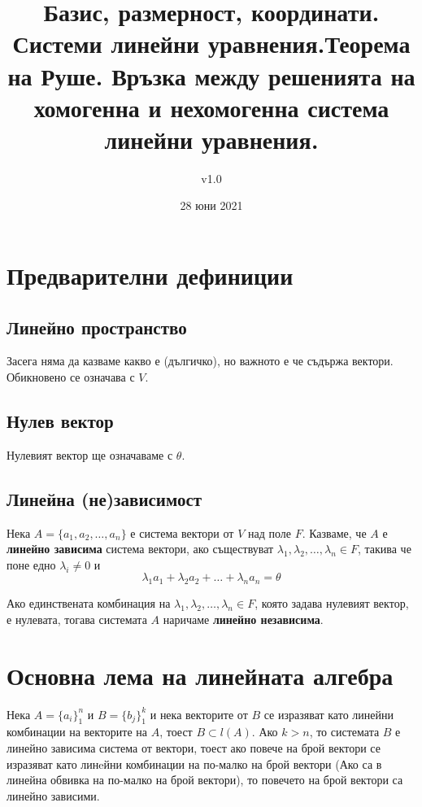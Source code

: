 \documentclass[fleqn,12pt]{article}
\title{Базис, размерност, координати.  Системи линейни уравнения.Теорема на Руше. Връзка между решенията на хомогенна и нехомогенна система линейни уравнения.}
\author{v1.0}
\date{28 юни 2021}
\begin{document}
\maketitle

\tableofcontents
\pagebreak

\begin{flushleft}

\section{Предварителни дефиниции}
\subsection{Линейно пространство}
Засега няма да казваме какво е (дългичко), но важното е че съдържа вектори. Обикновено се означава с $V$.

\subsection{Нулев вектор}
Нулевият вектор ще означаваме с $\theta$.

\subsection{Линейна (не)зависимост}
Нека $A = \{a_1, a_2, \dots, a_n\}$ е система вектори от $V$ над поле $F$. Казваме, че $A$ е
\textbf{линейно зависима} система вектори, ако съществуват $\lambda_1, \lambda_2, \dots, \lambda_n \in F$, такива че 
поне едно $\lambda_i \neq 0$ и
\[ \lambda_1 a_1 + \lambda_2 a_2 + \dots + \lambda_n a_n = \theta \]

Ако единствената комбинация на $\lambda_1, \lambda_2, \dots, \lambda_n \in F$, която задава нулевият вектор, е нулевата, 
тогава системата $A$ наричаме \textbf{линейно независима}.

\section{Основна лема на линейната алгебра}
Нека $A = \{ a_i \}_1^n $ и $B = \{ b_j \}_1^k $ и нека векторите от $B$ се изразяват като линейни комбинации на векторите на $A$, тоест $B \subset l(A)$.
Ако $ k > n $, то системата $B$ е линейно зависима система от вектори, тоест ако повече на брой вектори се изразяват като линeйни комбинации на по-малко на брой вектори (Ако са в линейна обвивка на по-малко на брой вектори), то повечето на брой вектори са линейно зависими.


\end{flushleft}
\end{document}
